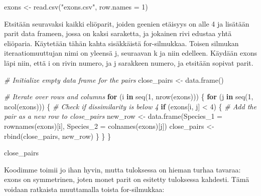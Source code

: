 \documentclass[
]{book}
\newenvironment{Shaded}{\begin{snugshade}}{\end{snugshade}}
\newcommand{\AttributeTok}[1]{\textcolor[rgb]{0.77,0.63,0.00}{#1}}
\newcommand{\CommentTok}[1]{\textcolor[rgb]{0.56,0.35,0.01}{\textit{#1}}}
\newcommand{\ControlFlowTok}[1]{\textcolor[rgb]{0.13,0.29,0.53}{\textbf{#1}}}
\newcommand{\DecValTok}[1]{\textcolor[rgb]{0.00,0.00,0.81}{#1}}
\newcommand{\FunctionTok}[1]{\textcolor[rgb]{0.00,0.00,0.00}{#1}}
\newcommand{\NormalTok}[1]{#1}
\newcommand{\OtherTok}[1]{\textcolor[rgb]{0.56,0.35,0.01}{#1}}
\newcommand{\SpecialCharTok}[1]{\textcolor[rgb]{0.00,0.00,0.00}{#1}}
\newcommand{\StringTok}[1]{\textcolor[rgb]{0.31,0.60,0.02}{#1}}
\begin{document}
\begin{Shaded}
\begin{Highlighting}[]
\NormalTok{exons }\OtherTok{\textless{}{-}} \FunctionTok{read.csv}\NormalTok{(}\StringTok{"exons.csv"}\NormalTok{, }\AttributeTok{row.names =} \DecValTok{1}\NormalTok{)}
\end{Highlighting}
\end{Shaded}

Etsitään seuravaksi kaikki eliöparit, joiden geenien etäisyys on alle 4 ja lisätään parit data frameen, jossa on kaksi saraketta, ja jokainen rivi edustaa yhtä eliöparia. Käytetään tähän kahta sisäkkäistä for-silmukkaa. Toisen silmukan iteraatiomuuttujan nimi on yleensä j, seuraavan k ja niin edelleen. Käydään exons läpi niin, että i on rivin numero, ja j sarakkeen numero, ja etsitään sopivat parit.

\begin{Shaded}
\begin{Highlighting}[]
\CommentTok{\# Initialize empty data frame for the pairs}
\NormalTok{close\_pairs }\OtherTok{\textless{}{-}} \FunctionTok{data.frame}\NormalTok{()}

\CommentTok{\# Iterate over rows and columns}
\ControlFlowTok{for}\NormalTok{ (i }\ControlFlowTok{in} \FunctionTok{seq}\NormalTok{(}\DecValTok{1}\NormalTok{, }\FunctionTok{nrow}\NormalTok{(exons))) \{}
  \ControlFlowTok{for}\NormalTok{ (j }\ControlFlowTok{in} \FunctionTok{seq}\NormalTok{(}\DecValTok{1}\NormalTok{, }\FunctionTok{ncol}\NormalTok{(exons))) \{}
    \CommentTok{\# Check if dissimilarity is below 4}
    \ControlFlowTok{if}\NormalTok{ (exons[i, j] }\SpecialCharTok{\textless{}} \DecValTok{4}\NormalTok{) \{}
      \CommentTok{\# Add the pair as a new row to close\_pairs}
\NormalTok{      new\_row }\OtherTok{\textless{}{-}} \FunctionTok{data.frame}\NormalTok{(}\AttributeTok{Species\_1 =} \FunctionTok{rownames}\NormalTok{(exons)[i],}
                            \AttributeTok{Species\_2 =} \FunctionTok{colnames}\NormalTok{(exons)[j])}
\NormalTok{      close\_pairs }\OtherTok{\textless{}{-}} \FunctionTok{rbind}\NormalTok{(close\_pairs,}
\NormalTok{                           new\_row)}
\NormalTok{    \}}
\NormalTok{  \}}
\NormalTok{\}}

\NormalTok{close\_pairs}
\end{Highlighting}
\end{Shaded}

Koodimme toimii jo ihan hyvin, mutta tuloksessa on hieman turhaa tavaraa: exons on symmetrinen, joten monet parit on esitetty tuloksessa kahdesti. Tämä voidaan ratkaista muuttamalla toista for-silmukkaa:
\end{document}
